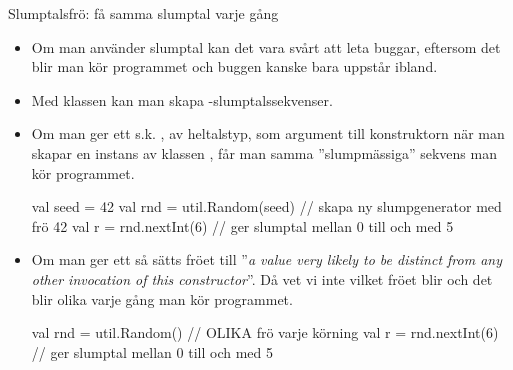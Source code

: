 \begin{Slide}{Slumptalsfrö: få samma slumptal varje gång}\SlideFontTiny
\begin{itemize}
\item Om man använder slumptal kan det vara svårt att leta buggar, eftersom det blir  man kör programmet och buggen kanske bara uppstår ibland.

\item Med klassen  kan man skapa -slumptalssekvenser.
\pause
\item Om man ger ett s.k.  , av heltalstyp, som argument till konstruktorn när man skapar en instans av klassen , får man samma ''slumpmässiga'' sekvens  man kör programmet.

\begin{Code}
  val seed = 42
  val rnd = util.Random(seed) // skapa ny slumpgenerator med frö 42
  val r = rnd.nextInt(6) // ger slumptal mellan 0 till och med 5
\end{Code}
\pause
\item Om man  ger ett  så sätts fröet till ''\emph{a value very likely to be distinct from any other invocation of this constructor}''. Då vet vi inte vilket fröet blir och det blir olika varje gång man kör programmet.
\begin{Code}
  val rnd = util.Random() // OLIKA frö varje körning
  val r = rnd.nextInt(6) // ger slumptal mellan 0 till och med 5
\end{Code}
\end{itemize}
\end{Slide}

%
%
%
%

